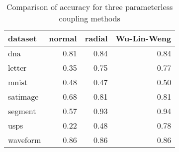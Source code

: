 \begin{table}[ht]
\centering
\begin{tabular}{lrrr}
  \hline
dataset & normal & radial & Wu-Lin-Weng \\ 
  \hline
dna & 0.81 & 0.84 & 0.84 \\ 
  letter & 0.35 & 0.75 & 0.77 \\ 
  mnist & 0.48 & 0.47 & 0.50 \\ 
  satimage & 0.68 & 0.81 & 0.81 \\ 
  segment & 0.57 & 0.93 & 0.94 \\ 
  usps & 0.22 & 0.48 & 0.78 \\ 
  waveform & 0.86 & 0.86 & 0.86 \\ 
   \hline
\end{tabular}
\caption{Comparison of accuracy for three parameterless coupling methods} 
\label{tab:multi}
\end{table}
